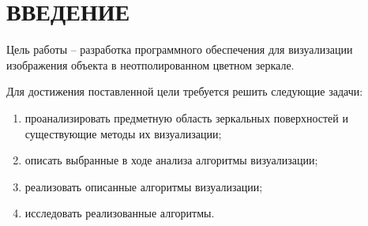 \chapter*{ВВЕДЕНИЕ}

Цель работы -- разработка программного обеспечения для визуализации изображения объекта в неотполированном цветном зеркале.

Для достижения поставленной цели требуется решить следующие задачи:

\begin{enumerate}
	\item проанализировать предметную область зеркальных поверхностей и существующие методы их визуализации;
	\item описать выбранные в ходе анализа алгоритмы визуализации;
	\item реализовать описанные алгоритмы визуализации;
	\item исследовать реализованные алгоритмы.
\end{enumerate}